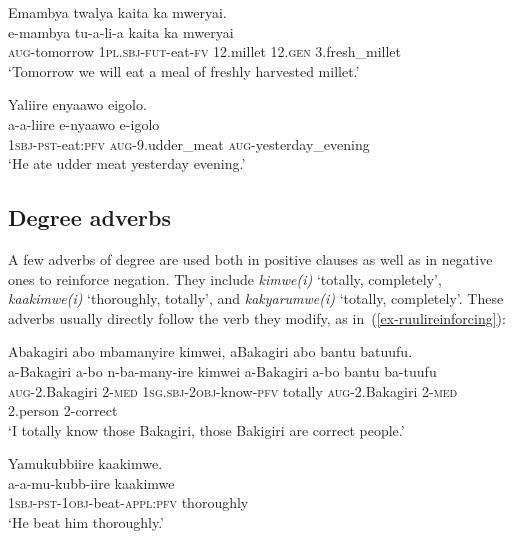 \ea \label{ex-adverbs-temp}
\begin{xlist}
\ex \label{ex-adverbs-temp1}
	\glll  Emambya twalya kaita ka mweryai.\\
	e-mambya tu-a-li-a kaita ka mweryai\\
	\textsc{aug}-tomorrow	1\textsc{pl.sbj}-\textsc{fut}-eat-\textsc{fv} 12.millet 12.\textsc{gen}  3.fresh\_millet\\
	\glt `Tomorrow we will eat a meal of freshly harvested millet.'

\ex \label{ex-adverbs-temp2}
	\glll  Yaliire enyaawo eigolo.\\
a-a-liire e-nyaawo e-igolo\\
\textsc{1sbj}-\textsc{pst}-eat:\textsc{pfv} \textsc{aug}-9.udder\_meat \textsc{aug}-yesterday\_evening\\
	\glt `He ate udder meat yesterday evening.'
\end{xlist}
\z

\subsection{Degree adverbs}\label{sec-syntax-adverbs-degree}
A few adverbs of degree are used both in positive clauses as well as in negative ones to reinforce negation. 
They include \textit{kimwe(i)} `totally, completely', \textit{kaaki\-mwe(i)} `thoroughly, totally', and \textit{kakyarumwe(i)} `totally, completely'.
These adverbs usually directly follow the verb they modify, as in~(\ref{ex-ruulireinforcing}):

\ea \label{ex-ruulireinforcing}
\begin{xlist}

\ex \label{ex-ruuliinflittle}
	\glll  Abakagiri abo mbamanyire kimwei, aBakagiri abo bantu batuufu.\\
		a-Bakagiri a-bo n-ba-many-ire kimwei a-Bakagiri a-bo bantu ba-tuufu\\
		\textsc{aug}-2.Bakagiri 2-\textsc{med} \textsc{1sg.sbj}-\textsc{2obj}-know-\textsc{pfv}  totally \textsc{aug}-2.Bakagiri 2-\textsc{med} 2.person 2-correct\\
	\glt ‘I totally know those Bakagiri, those Bakigiri are correct people.’ 
	
\ex \label{ex-ruuliinfmore}
	\glll	Yamukubbiire kaakimwe.\\
		a-a-mu-kubb-iire kaakimwe\\
		\textsc{1sbj}-\textsc{pst}-\textsc{1obj}-beat-\textsc{appl:pfv}  thoroughly\\
	\glt ‘He beat him thoroughly.’ 
\end{xlist}
\z

